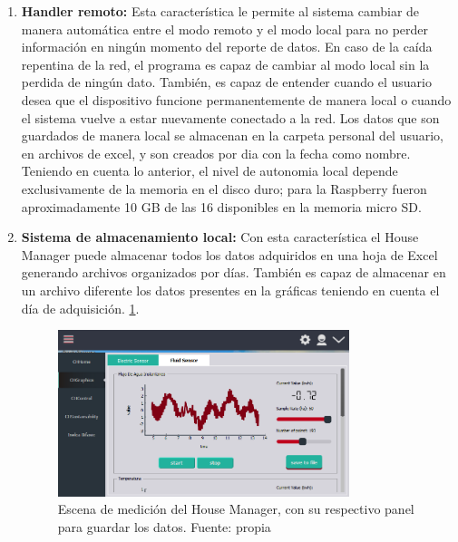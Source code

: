 \begin{enumerate}
	\item \textbf{Handler remoto:} Esta característica le permite al sistema cambiar de manera automática entre el modo remoto y el modo local para no perder información en ningún momento del reporte de datos. En caso de la caída repentina de la red, el programa es capaz de cambiar al modo local sin la perdida de ningún dato. También, es capaz de entender cuando el usuario desea que el dispositivo funcione permanentemente de manera local o cuando el sistema vuelve a estar nuevamente conectado a la red. Los datos que son guardados de manera local se almacenan en la carpeta personal del usuario, en archivos de excel, y son creados por dia con la fecha como nombre. Teniendo en cuenta lo anterior, el nivel de autonomia local depende exclusivamente de la memoria en el disco duro; para la Raspberry fueron aproximadamente 10 GB de las 16 disponibles en la memoria micro SD.
	
	\item \textbf{Sistema de almacenamiento local:} Con esta característica el House Manager puede almacenar todos los datos adquiridos en una hoja de Excel generando archivos organizados por días. También es capaz de almacenar en un archivo diferente los datos presentes en la gráficas teniendo en cuenta el día de adquisición. \ref{fig_9}.
	\begin{figure}[htbp]
		\centerline{\includegraphics[width=8.5cm]{figuras/housemanager_measure.png}}
		\caption{Escena de medición del House Manager, con su respectivo panel para guardar los datos. Fuente: propia}
		\label{fig_9}
	\end{figure}


\end{enumerate}
